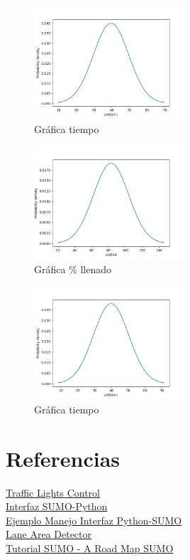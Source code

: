 \documentclass{article}
\begin{document}
\begin{figure}[h!]
\caption{Gráfica tiempo}
\centering
\includegraphics[width=0.5\textwidth]{linea3t.png}
\end{figure}

\begin{figure}[h!]
\caption{Gráfica \% llenado}
\centering
\includegraphics[width=0.5\textwidth]{linea4.png}
\end{figure}

\begin{figure}[h!]
\caption{Gráfica tiempo}
\centering
\includegraphics[width=0.5\textwidth]{linea4t.png}
\end{figure}



\newpage
\section{Referencias}

\href{https://sumo.dlr.de/docs/Simulation/Traffic_Lights.html}{Traffic Lights Control}\\
\href{https://pypi.org/project/traci/}{Interfaz SUMO-Python}\\
\href{https://github.com/ethanpng2021/sumo-example/blob/main/2021-05-01-22-25-37/sumo_run.py}{Ejemplo Manejo Interfaz Python-SUMO}\\
\href{https://sumo.dlr.de/docs/TraCI/Lane_Area_Detector_Value_Retrieval.html}{Lane Area Detector}\\
\href{https://cst.fee.unicamp.br/sites/default/files/sumo/sumo-roadmap.pdf}{Tutorial SUMO - A Road Map SUMO}
\end{document}
